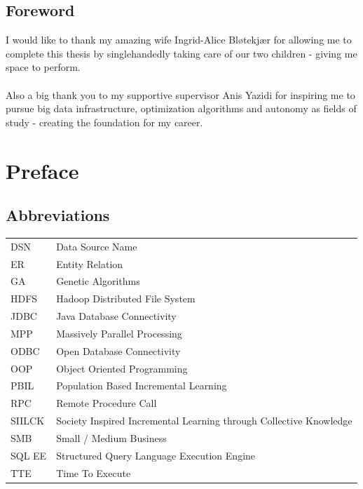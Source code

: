 \documentclass[a4paper,english]{report}
\begin{document}
	\pagebreak
	\section{Foreword}
	
	I would like to thank my amazing wife Ingrid-Alice Bløtekjær for allowing me to complete this thesis by singlehandedly taking care of our two children - giving me space to perform.
	\\
	\\
	Also a big thank you to my supportive supervisor Anis Yazidi for inspiring me to pursue big data infrastructure, optimization algorithms and autonomy as fields of study - creating the foundation for my career.
	
	\tableofcontents
	
	\chapter{Preface}
	\section{Abbreviations}
	\label{word_list}
	\begin{table}[H]
		\centering
		\begin{tabular}{ll}
			
			DSN & Data Source Name \\
			ER & Entity Relation \\
			GA & Genetic Algorithms \\
			HDFS & Hadoop Distributed File System \\
			JDBC & Java Database Connectivity \\
			MPP & Massively Parallel Processing \\
			ODBC & Open Database Connectivity \\
			OOP	& Object Oriented Programming \\
			PBIL & Population Based Incremental Learning \\
			RPC & Remote Procedure Call \\
			SIILCK & Society Inspired Incremental Learning through Collective Knowledge \\
			SMB & Small / Medium Business \\
			SQL EE & Structured Query Language Execution Engine \\
			TTE	& Time To Execute \\
			
		\end{tabular}
	\end{table}
\end{document}
